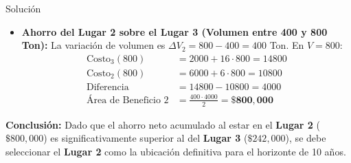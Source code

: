\documentclass[11pt, a4paper]{article}
\begin{document}
\begin{ejercicio}{Solución}
\begin{itemize}
    \item \textbf{Ahorro del Lugar 2 sobre el Lugar 3 (Volumen entre 400 y 800 Ton):}
    La variación de volumen es $\Delta V_2 = 800 - 400 = 400$ Ton.
    En $V=800$:
    \begin{align*}
      \text{Costo}_3(800) &= 2000 + 16 \cdot 800 = 14800 \\
      \text{Costo}_2(800) &= 6000 + 6 \cdot 800 = 10800 \\
      \text{Diferencia} &= 14800 - 10800 = 4000 \\
      \text{Área de Beneficio 2} &= \frac{400 \cdot 4000}{2} = \mathbf{\$800,000}
    \end{align*}
  \end{itemize}

  \textbf{Conclusión:} Dado que el ahorro neto acumulado al estar en el \textbf{Lugar 2} ($\$800,000$) es significativamente superior al del \textbf{Lugar 3} ($\$242,000$), se debe seleccionar el \textbf{Lugar 2} como la ubicación definitiva para el horizonte de 10 años.

\end{ejercicio}
\end{document}
